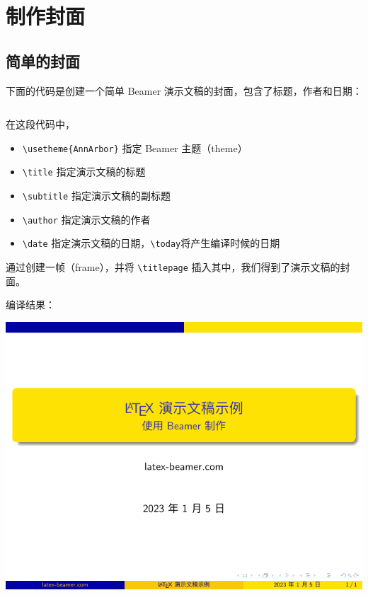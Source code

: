 \section{制作封面}

\subsection{简单的封面}

下面的代码是创建一个简单 Beamer 演示文稿的封面，包含了标题，作者和日期：

\inputminted[linenos=true]{latex}{examples/beamer/beamertitle01.tex}

在这段代码中，
\begin{itemize}
  \item \verb|\usetheme{AnnArbor}| 指定 Beamer 主题（theme）
  \item \verb|\title| 指定演示文稿的标题
  \item \verb|\subtitle| 指定演示文稿的副标题
  \item \verb|\author| 指定演示文稿的作者
  \item \verb|\date| 指定演示文稿的日期，\verb|\today|将产生编译时候的日期
\end{itemize}

\begin{remark*}
通过创建一帧（frame），并将 \verb|\titlepage| 插入其中，我们得到了演示文稿的封面。
\end{remark*}

编译结果：

\includegraphics{examples/beamer/beamertitle01.pdf}

